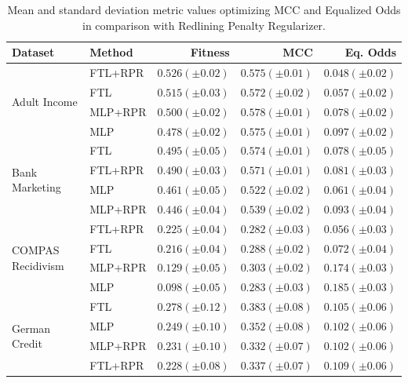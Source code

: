  \begin{table}
    \centering
    \caption{Mean and standard deviation metric values optimizing MCC and Equalized Odds in comparison with Redlining Penalty Regularizer.}\label{tab:complete_mcc_odds_rpr}
    {\footnotesize\begin{tabular}{llrrr}
    \toprule
    Dataset & Method & Fitness & MCC & Eq. Odds \\
    \midrule

    \multirow[t]{4}{*}{Adult Income} & FTL+RPR & $0.526 (\pm0.02)$ & $0.575 (\pm0.01)$ & $0.048 (\pm0.02)$ \\
     & FTL & $0.515 (\pm0.03)$ & $0.572 (\pm0.02)$ & $0.057 (\pm0.02)$ \\
     & MLP+RPR & $0.500 (\pm0.02)$ & $0.578 (\pm0.01)$ & $0.078 (\pm0.02)$ \\
     & MLP & $0.478 (\pm0.02)$ & $0.575 (\pm0.01)$ & $0.097 (\pm0.02)$ \\
    \midrule
    \multirow[t]{4}{*}{Bank Marketing} & FTL & $0.495 (\pm0.05)$ & $0.574 (\pm0.01)$ & $0.078 (\pm0.05)$ \\
     & FTL+RPR & $0.490 (\pm0.03)$ & $0.571 (\pm0.01)$ & $0.081 (\pm0.03)$ \\
     & MLP & $0.461 (\pm0.05)$ & $0.522 (\pm0.02)$ & $0.061 (\pm0.04)$ \\
     & MLP+RPR & $0.446 (\pm0.04)$ & $0.539 (\pm0.02)$ & $0.093 (\pm0.04)$ \\
    \midrule
    \multirow[t]{4}{*}{COMPAS Recidivism} & FTL+RPR & $0.225 (\pm0.04)$ & $0.282 (\pm0.03)$ & $0.056 (\pm0.03)$ \\
     & FTL & $0.216 (\pm0.04)$ & $0.288 (\pm0.02)$ & $0.072 (\pm0.04)$ \\
     & MLP+RPR & $0.129 (\pm0.05)$ & $0.303 (\pm0.02)$ & $0.174 (\pm0.03)$ \\
     & MLP & $0.098 (\pm0.05)$ & $0.283 (\pm0.03)$ & $0.185 (\pm0.03)$ \\
    \midrule
    \multirow[t]{4}{*}{German Credit} & FTL & $0.278 (\pm0.12)$ & $0.383 (\pm0.08)$ & $0.105 (\pm0.06)$ \\
     & MLP & $0.249 (\pm0.10)$ & $0.352 (\pm0.08)$ & $0.102 (\pm0.06)$ \\
     & MLP+RPR & $0.231 (\pm0.10)$ & $0.332 (\pm0.07)$ & $0.102 (\pm0.06)$ \\
     & FTL+RPR & $0.228 (\pm0.08)$ & $0.337 (\pm0.07)$ & $0.109 (\pm0.06)$ \\
     \bottomrule
\end{tabular}}
\end{table}

